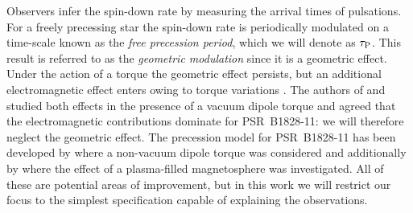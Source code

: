 \documentclass[../full_thesis/full_thesis.tex]{subfiles}
\begin{document}
Observers infer the spin-down rate by measuring the arrival times of
pulsations.
For a freely precessing star the spin-down rate is periodically modulated on a
time-scale known as the \emph{free precession period}, which we will denote as
$\tau_{\mathrm{P}}$.  This result is referred to as the \emph{geometric modulation}
\citep{Jones2001} since it is a geometric effect.  Under the action of a torque
the geometric effect persists, but an additional electromagnetic effect enters
owing to torque variations \citep{Cordes1993}. The authors of
\citet{Jones2001} and \citet{Link2001} studied both effects in the
presence of a vacuum dipole torque \citep{Davis1970} and agreed that the
electromagnetic contributions dominate for PSR~B1828-11: we will therefore neglect
the geometric effect. The precession model for
PSR~B1828-11 has been developed by \citet{Akgun2006} where a non-vacuum
dipole torque was considered and additionally by \citet{Arzamasskiy2015}
where the effect of a plasma-filled magnetosphere was investigated. All of these are
potential areas of improvement, but in this work we will restrict our focus
to the simplest specification capable of explaining the observations.
\end{document}
